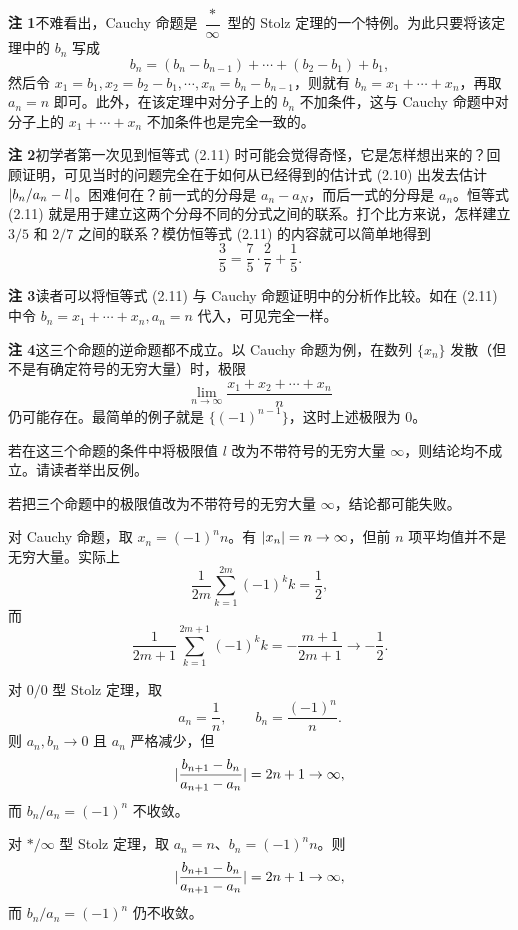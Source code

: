\begin{xremark}
\textbf{注 1}\quad 不难看出，Cauchy 命题是 $\dfrac*\infty$ 型的 Stolz 定理的一个特例。为此只要将该定理中的 $b_n$ 写成
\[
  b_n=(b_n-b_{n-1})+\cdots+(b_2-b_1)+b_1,
\]
然后令 $x_1=b_1,x_2=b_2-b_1,\cdots,x_n=b_n-b_{n-1}$，则就有 $b_n=x_1+\cdots+x_n$，再取 $a_n=n$ 即可。此外，在该定理中对分子上的 $b_n$ 不加条件，这与 Cauchy 命题中对分子上的 $x_1+\cdots+x_n$ 不加条件也是完全一致的。

\textbf{注 2}\quad 初学者第一次见到恒等式 (2.11) 时可能会觉得奇怪，它是怎样想出来的？回顾证明，可见当时的问题完全在于如何从已经得到的估计式 (2.10) 出发去估计 $\lvert b_n/a_n-l\rvert$。困难何在？前一式的分母是 $a_n-a_N$，而后一式的分母是 $a_n$。恒等式 (2.11) 就是用于建立这两个分母不同的分式之间的联系。打个比方来说，怎样建立 $3/5$ 和 $2/7$ 之间的联系？模仿恒等式 (2.11) 的内容就可以简单地得到
\[
  \frac35=\frac75\cdot\frac27+\frac15.
\]

\textbf{注 3}\quad 读者可以将恒等式 (2.11) 与 Cauchy 命题证明中的分析作比较。如在 (2.11) 中令 $b_n=x_1+\cdots+x_n,a_n=n$ 代入，可见完全一样。

\textbf{注 4}\quad 这三个命题的逆命题都不成立。以 Cauchy 命题为例，在数列 $\{x_n\}$ 发散（但不是有确定符号的无穷大量）时，极限
\[
  \lim_{n\to\infty}\frac{x_1+x_2+\cdots+x_n}{n}
\]
仍可能存在。最简单的例子就是 $\{(-1)^{n-1}\}$，这时上述极限为 0。
\end{xremark}

\begin{xthought}
若在这三个命题的条件中将极限值 $l$ 改为不带符号的无穷大量 $\infty$，则结论均不成立。请读者举出反例。
\end{xthought}
\begin{xsolution}
若把三个命题中的极限值改为不带符号的无穷大量 $\infty$，结论都可能失败。

对 Cauchy 命题，取 $x_n=(-1)^n n$。有 $\lvert x_n\rvert=n\to\infty$，但前 $n$ 项平均值并不是无穷大量。实际上
\[
  \frac1{2m}\sum_{k=1}^{2m}(-1)^k k=\frac12,
\]
而
\[
  \frac1{2m+1}\sum_{k=1}^{2m+1}(-1)^k k
  =-\frac{m+1}{2m+1}\to-\frac12.
\]

对 $0/0$ 型 Stolz 定理，取
\[
  a_n=\frac1n,\qquad b_n=\frac{(-1)^n}{n}.
\]
则 $a_n,b_n\to0$ 且 $a_n$ 严格减少，但
\[
  \lvert\frac{b_{n+1}-b_n}{a_{n+1}-a_n}\rvert
  =2n+1\to\infty,
\]
而 $b_n/a_n=(-1)^n$ 不收敛。

对 $*/\infty$ 型 Stolz 定理，取 $a_n=n$、$b_n=(-1)^n n$。则
\[
  \lvert\frac{b_{n+1}-b_n}{a_{n+1}-a_n}\rvert=2n+1\to\infty,
\]
而 $b_n/a_n=(-1)^n$ 仍不收敛。
\end{xsolution}


